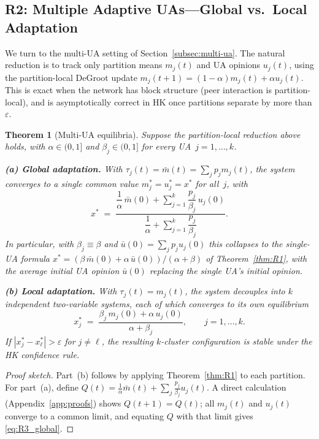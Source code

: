 \documentclass{article}
\theoremstyle{plain}
\newtheorem{theorem}{Theorem}[section]
\theoremstyle{definition}
\theoremstyle{remark}
\newcommand{\mbar}{\bar{m}}
\newcommand{\ubar}{\bar{u}}
\begin{document}
\subsection{R2: Multiple Adaptive UAs---Global vs.\ Local Adaptation}
\label{subsec:R2}

We turn to the multi-UA setting of Section~\ref{subsec:multi-ua}.
The natural reduction is to track only partition means
$m_j(t)$ and UA opinions $u_j(t)$, using the partition-local DeGroot
update $m_j(t+1)=(1-\alpha)m_j(t)+\alpha u_j(t)$.  This is exact when
the network has block structure (peer interaction is partition-local),
and is asymptotically correct in HK once partitions separate by more
than $\varepsilon$.

\begin{theorem}[Multi-UA equilibria]
\label{thm:R3}
Suppose the partition-local reduction above holds, with $\alpha\in(0,1]$
and $\beta_j\in(0,1]$ for every UA~$j=1,\ldots,k$.

\textbf{(a) Global adaptation.}  With $\tau_j(t)=\mbar(t)=\sum_j p_j
m_j(t)$, the system converges to a single common value
$m_j^*=u_j^*=x^*$ for all~$j$, with
\begin{equation}
    x^* \;=\;
    \frac{\dfrac{1}{\alpha}\,\mbar(0)
          + \sum_{j=1}^{k}\dfrac{p_j}{\beta_j}\,u_j(0)}
         {\dfrac{1}{\alpha}
          + \sum_{j=1}^{k}\dfrac{p_j}{\beta_j}}.
    \label{eq:R3_global}
\end{equation}
In particular, with $\beta_j\equiv\beta$ and $\ubar(0)=\sum_j p_j u_j(0)$
this collapses to the single-UA formula $x^*=(\beta\,\mbar(0)+\alpha\,\ubar(0))/(\alpha+\beta)$
of Theorem~\ref{thm:R1}, with the average initial UA opinion
$\ubar(0)$ replacing the single UA's initial opinion.

\textbf{(b) Local adaptation.}  With $\tau_j(t)=m_j(t)$, the system
decouples into $k$ independent two-variable systems, each of which
converges to its own equilibrium
\begin{equation}
    x_j^* \;=\;
    \frac{\beta_j\,m_j(0) + \alpha\,u_j(0)}{\alpha + \beta_j},
    \qquad j=1,\ldots,k.
    \label{eq:R3_local}
\end{equation}
If $|x_j^* - x_\ell^*|>\varepsilon$ for $j\neq\ell$, the resulting
$k$-cluster configuration is stable under the HK confidence rule.
\end{theorem}

\begin{proof}[Proof sketch]
Part~(b) follows by applying Theorem~\ref{thm:R1} to each partition.
For part~(a), define $Q(t)=\frac{1}{\alpha}\mbar(t)+\sum_j\frac{p_j}{\beta_j}u_j(t)$.
A direct calculation (Appendix~\ref{app:proofs}) shows $Q(t+1)=Q(t)$;
all $m_j(t)$ and $u_j(t)$ converge to a common limit, and equating
$Q$ with that limit gives \eqref{eq:R3_global}.
\end{proof}
\end{document}
